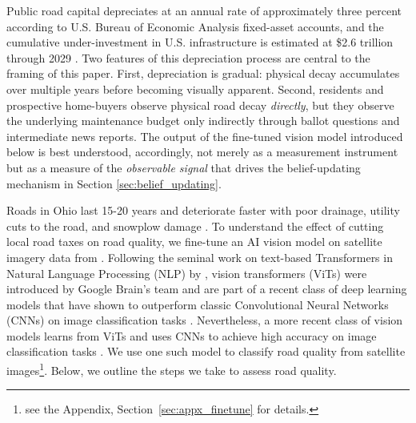 Public road capital depreciates at an annual rate of approximately three percent according to U.S. Bureau of Economic Analysis fixed-asset accounts, and the cumulative under-investment in U.S. infrastructure is estimated at \$2.6 trillion through 2029 \citep{asce2025report}. Two features of this depreciation process are central to the framing of this paper. First, depreciation is gradual: physical decay accumulates over multiple years before becoming visually apparent. Second, residents and prospective home-buyers observe physical road decay {\it directly}, but they observe the underlying maintenance budget only indirectly through ballot questions and intermediate news reports. The output of the fine-tuned vision model introduced below is best understood, accordingly, not merely as a measurement instrument but as a measure of the {\it observable signal} that drives the belief-updating mechanism in Section \ref{sec:belief_updating}.

Roads in Ohio last 15-20 years and deteriorate faster with poor drainage, utility cuts to the road, and snowplow damage \citep{hudson2020faq}.
To understand the effect of cutting local road taxes on road quality, we fine-tune an AI vision model on satellite imagery data from \cite{brewer2021}. Following the seminal work on text-based Transformers in Natural Language Processing (NLP) by \cite{vaswani2017attention}, vision transformers (ViTs) were introduced by Google Brain's team and are part of a recent class of deep learning models that have shown to outperform classic Convolutional Neural Networks (CNNs) on image classification tasks \citep{dosovitskiy2020image}. Nevertheless, a more recent class of vision models learns from ViTs and uses CNNs to achieve high accuracy on image classification tasks \citep{woo2023convnext}. We use one such model to classify road quality from satellite images\footnote{see the Appendix, Section~\ref{sec:appx_finetune} for details.}. Below, we outline the steps we take to assess road quality.



